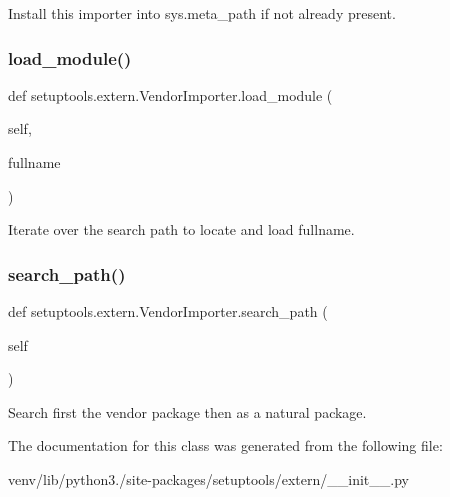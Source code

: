 \begin{DoxyVerb}Install this importer into sys.meta_path if not already present.
\end{DoxyVerb}
 \mbox{\label{classsetuptools_1_1extern_1_1_vendor_importer_a1d782aed41c8f30932f3be255f1f9b37}} 
\subsubsection{\texorpdfstring{load\+\_\+module()}{load\_module()}}
{\footnotesize\ttfamily def setuptools.\+extern.\+Vendor\+Importer.\+load\+\_\+module (\begin{DoxyParamCaption}\item[{}]{self,  }\item[{}]{fullname }\end{DoxyParamCaption})}

\begin{DoxyVerb}Iterate over the search path to locate and load fullname.
\end{DoxyVerb}
 \mbox{\label{classsetuptools_1_1extern_1_1_vendor_importer_ad443f2f83ec349be9f556dd6cb0602a0}} 
\subsubsection{\texorpdfstring{search\+\_\+path()}{search\_path()}}
{\footnotesize\ttfamily def setuptools.\+extern.\+Vendor\+Importer.\+search\+\_\+path (\begin{DoxyParamCaption}\item[{}]{self }\end{DoxyParamCaption})}

\begin{DoxyVerb}Search first the vendor package then as a natural package.
\end{DoxyVerb}
 

The documentation for this class was generated from the following file\+:\begin{DoxyCompactItemize}
\item 
venv/lib/python3./site-\/packages/setuptools/extern/\+\_\+\+\_\+init\+\_\+\+\_\+.\+py\end{DoxyCompactItemize}
